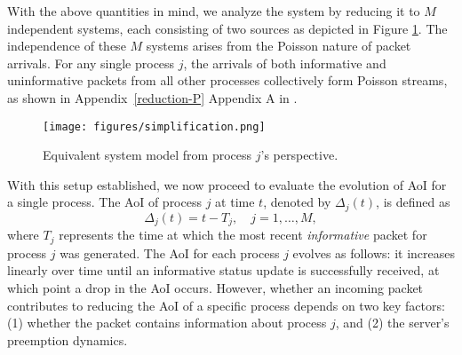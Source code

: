 With the above quantities in mind, we analyze the system by reducing it to $M$ independent systems, each consisting of two sources as depicted in Figure \ref{fig:equiv_model}. The independence of these $M$ systems arises from the Poisson nature of packet arrivals. For any single process $j$, the arrivals of both informative and uninformative packets from all other processes collectively form Poisson streams, as shown in 
{Appendix~\ref{reduction-P}}
{Appendix A in \cite{technicalNote}}.%



\begin{figure}[!t]
  \centering
  \texttt{[image: figures/simplification.png]}
  \caption{Equivalent system model from process $j$'s perspective.}
  \vspace{-12pt}\label{fig:equiv_model}
\end{figure}

With this setup established, we now proceed to evaluate the evolution of AoI for a single process. The AoI of process \(j\) at time \(t\), denoted by \(\Delta_j(t)\), is defined as
\begin{equation}
\Delta_j(t) = t - T_j, \quad j=1,\ldots,M,
\end{equation}
where \(T_j\) represents the time at which the most recent \textit{informative} packet for process \(j\) was generated. The AoI for each process \(j\) evolves as follows: it increases linearly over time until an informative status update is successfully received, at which point a drop in the AoI occurs. However, whether an incoming packet contributes to reducing the AoI of a specific process depends on two key factors: (1) whether the packet contains information about process \(j\), and (2) the server's preemption dynamics.


